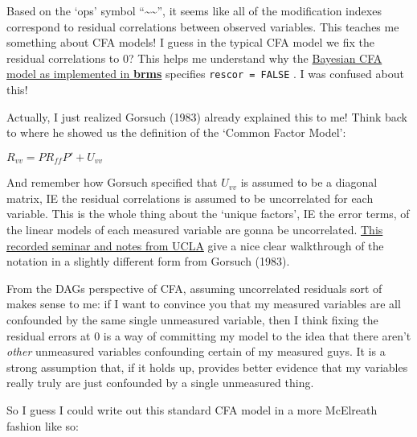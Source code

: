 \documentclass[
  letterpaper,
  DIV=11,
  numbers=noendperiod]{scrreprt}
\begin{document}
Based on the `ops' symbol ``\textasciitilde\textasciitilde{}'', it seems
like all of the modification indexes correspond to residual correlations
between observed variables. This teaches me something about CFA models!
I guess in the typical CFA model we fix the residual correlations to 0?
This helps me understand why the
\href{https://discourse.mc-stan.org/t/confirmatory-factor-analysis-using-brms/23139}{Bayesian
CFA model as implemented in \textbf{brms}} specifies
\texttt{rescor\ =\ FALSE} . I was confused about this!

Actually, I just realized Gorsuch (1983) already explained this to me!
Think back to where he showed us the definition of the `Common Factor
Model':

\(R_{vv} = PR_{ff}P' + U_{vv}\)

And remember how Gorsuch specified that \(U_{vv}\) is assumed to be a
diagonal matrix, IE the residual correlations is assumed to be
uncorrelated for each variable. This is the whole thing about the
`unique factors', IE the error terms, of the linear models of each
measured variable are gonna be uncorrelated.
\href{https://stats.oarc.ucla.edu/r/seminars/rcfa/}{This recorded
seminar and notes from UCLA} give a nice clear walkthrough of the
notation in a slightly different form from Gorsuch (1983).

From the DAGs perspective of CFA, assuming uncorrelated residuals sort
of makes sense to me: if I want to convince you that my measured
variables are all confounded by the same single unmeasured variable,
then I think fixing the residual errors at 0 is a way of committing my
model to the idea that there aren't \emph{other} unmeasured variables
confounding certain of my measured guys. It is a strong assumption that,
if it holds up, provides better evidence that my variables really truly
are just confounded by a single unmeasured thing.

So I guess I could write out this standard CFA model in a more McElreath
fashion like so:
\end{document}
